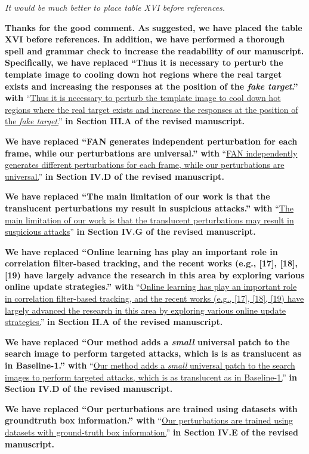 \documentclass[12pt]{article}
\begin{document}
\textit{It would be much better to place table XVI before references.}

\textbf{Thanks for the good comment. As suggested, we have placed the table XVI before references. In addition, we have performed a thorough spell and grammar check to increase the readability of our manuscript. Specifically, we have replaced ``Thus it is necessary to perturb the template image to cooling down hot regions where the real target exists and increasing the responses at the position of the \textit{fake target}.'' with} ``\uline{Thus it is necessary to perturb the template image to cool down hot regions where the real target exists and increase the responses at the position of the \textit{fake target}.}''
\textbf{in Section III.A of the revised manuscript.}

\textbf{We have replaced ``FAN generates independent perturbation for each frame, while our perturbations are universal.'' with} ``\uline{FAN independently generates different perturbations for each frame, while our perturbations are universal.}'' \textbf{in Section IV.D of the revised manuscript.}

\textbf{We have replaced ``The main limitation of our work is that the translucent perturbations my result in suspicious attacks.'' with} ``\uline{The main limitation of our work is that the translucent perturbations may result in suspicious attacks}'' \textbf{in Section IV.G of the revised manuscript.}

\textbf{We have replaced ``Online learning has play an important role in correlation filter-based tracking, and the recent works (e.g., [17], [18], [19) have largely advance the research in this area by exploring various online update strategies.'' with} ``\uline{Online learning has play an important role in correlation filter-based tracking, and the recent works (e.g., [17], [18], [19) have largely advanced the research in this area by exploring various online update strategies.}'' \textbf{in Section II.A of the revised manuscript.}

\textbf{We have replaced ``Our method adds a \textit{small} universal patch to the search image to perform targeted attacks, which is is as translucent as in Baseline-1.'' with} ``\uline{Our method adds a \textit{small} universal patch to the search images to perform targeted attacks, which is as translucent as in Baseline-1.}'' \textbf{in Section IV.D of the revised manuscript.}

\textbf{We have replaced ``Our perturbations are trained using datasets with groundtruth box information.'' with} ``\uline{Our perturbations are trained using datasets with ground-truth box information.}'' \textbf{in Section IV.E of the revised manuscript.}
\end{document}
